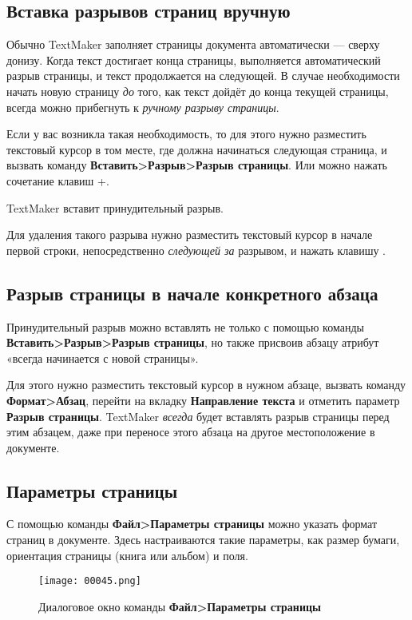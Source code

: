 \documentclass[a4paper,10pt]{article}
\begin{document}
\subsection{Вставка разрывов страниц вручную}
Обычно TextMaker заполняет страницы документа автоматически --- сверху донизу. Когда текст достигает конца страницы, выполняется автоматический разрыв страницы, и текст продолжается на следующей. В случае необходимости начать новую страницу \textit{до} того, как текст дойдёт до конца текущей страницы, всегда можно прибегнуть к \textit{ручному разрыву страницы}.

Если у вас возникла такая необходимость, то для этого нужно разместить текстовый курсор в том месте, где должна начинаться следующая страница, и вызвать команду \textbf{Вставить>Разрыв>Разрыв страницы}. Или можно нажать сочетание клавиш +.

TextMaker вставит принудительный разрыв.

Для удаления такого разрыва нужно разместить текстовый курсор в начале первой строки, непосредственно \textit{следующей за} разрывом, и нажать клавишу .

\subsection{Разрыв страницы в начале конкретного абзаца}
Принудительный разрыв можно вставлять не только с помощью команды \textbf{Вставить>Разрыв>Разрыв страницы}, но также присвоив абзацу атрибут «всегда начинается с новой страницы».

Для этого нужно разместить текстовый курсор в нужном абзаце, вызвать команду \textbf{Формат>Абзац}, перейти на вкладку \textbf{Направление текста} и отметить параметр \textbf{Разрыв страницы}. TextMaker \textit{всегда} будет вставлять разрыв страницы перед этим абзацем, даже при переносе этого абзаца на другое местоположение в документе.

\subsection{Параметры страницы}
С помощью команды \textbf{Файл>Параметры страницы} можно указать формат страниц в документе. Здесь настраиваются такие параметры, как размер бумаги, ориентация страницы (книга или альбом) и поля.

\begin{figure}[ht]
\texttt{[image: 00045.png]}
\centering
\caption{Диалоговое окно команды \textbf{Файл>Параметры страницы}}
\end{figure}
\end{document}

